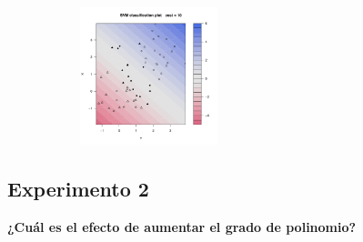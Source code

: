 \begin{figure}[H]
\begin{subfigure}{4cm}
		\caption{}
	\end{subfigure}
	\begin{subfigure}{4cm}
		\includegraphics[width=4cm]{Graphics/Problema_01/Experiment_01_4.pdf}
		\caption{}
	\end{subfigure}
	\caption{}
\end{figure}

\subsection*{Experimento 2}

\textbf{¿Cuál es el efecto de aumentar el grado de polinomio?}

